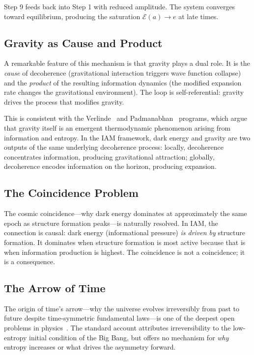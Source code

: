 \documentclass[twocolumn,superscriptaddress,prl,amsmath,amssymb]{revtex4-2}
\begin{document}
Step 9 feeds back into Step 1 with reduced amplitude. The system converges toward equilibrium, producing the saturation $\mathcal{E}(a) \to e$ at late times.

\subsection{Gravity as Cause and Product}

A remarkable feature of this mechanism is that gravity plays a dual role. It is the \textit{cause} of decoherence (gravitational interaction triggers wave function collapse) and the \textit{product} of the resulting information dynamics (the modified expansion rate changes the gravitational environment). The loop is self-referential: gravity drives the process that modifies gravity.

This is consistent with the Verlinde~\cite{Verlinde2011} and Padmanabhan~\cite{Padmanabhan2010} programs, which argue that gravity itself is an emergent thermodynamic phenomenon arising from information and entropy. In the IAM framework, dark energy and gravity are two outputs of the same underlying decoherence process: locally, decoherence concentrates information, producing gravitational attraction; globally, decoherence encodes information on the horizon, producing expansion.

\subsection{The Coincidence Problem}

The cosmic coincidence---why dark energy dominates at approximately the same epoch as structure formation peaks---is naturally resolved. In IAM, the connection is causal: dark energy (informational pressure) \textit{is driven by} structure formation. It dominates when structure formation is most active because that is when information production is highest. The coincidence is not a coincidence; it is a consequence.

\subsection{The Arrow of Time}

The origin of time's arrow---why the universe evolves irreversibly from past to future despite time-symmetric fundamental laws---is one of the deepest open problems in physics~\cite{Penrose1989,Carroll2004}. The standard account attributes irreversibility to the low-entropy initial condition of the Big Bang, but offers no mechanism for \textit{why} entropy increases or what drives the asymmetry forward.
\end{document}
